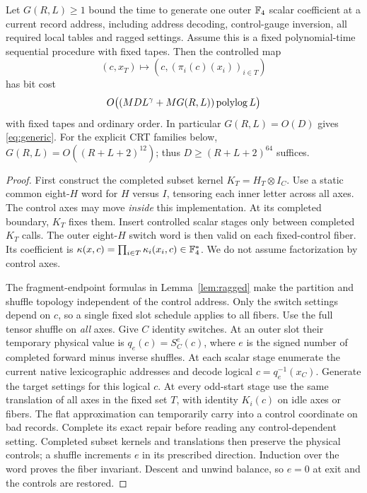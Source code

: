 \begin{lemma}
\label{lem:controlled}
Let $G(R,L)\ge1$ bound the time to generate one outer $\mathbb F_4$ scalar
coefficient at a current record address, including address decoding,
control-gauge inversion, all required local tables and ragged settings.
Assume this is a fixed polynomial-time sequential procedure with fixed
tapes. Then the controlled map
\[
 (c,x_T)\longmapsto(c,(\pi_i(c)(x_i))_{i\in T})
\]
has bit cost
\[
 O\bigl((MDL^\gamma+MG(R,L))\operatorname{polylog} L\bigr)
\]
with fixed tapes and ordinary order. In particular $G(R,L)=O(D)$
gives \eqref{eq:generic}. For the explicit CRT families below,
$G(R,L)=O((R+L+2)^{12})$; thus $D\ge(R+L+2)^{64}$ suffices.
\end{lemma}
\begin{proof}
First construct the completed subset kernel
$K_T=H_T\otimes I_C$. Use a static common eight-$H$ word for $H$ versus
$I$, tensoring each inner letter across all axes. The control axes may
move \emph{inside} this implementation. At its completed boundary,
$K_T$ fixes them. Insert controlled scalar stages only between completed
$K_T$ calls. The outer eight-$H$ switch word is then valid on each
fixed-control fiber. Its coefficient is
$\kappa(x,c)=\prod_{i\in T}\kappa_i(x_i,c)\in\mathbb F_4^*$.
We do not assume factorization by control axes.

The fragment-endpoint formulas in Lemma~\ref{lem:ragged} make the
partition and shuffle topology independent of the control address.
Only the switch settings depend on $c$, so a single fixed slot
schedule applies to all fibers.
Use the full tensor shuffle on \emph{all} axes. Give $C$ identity
switches. At an outer slot their temporary physical value is
$q_e(c)=S_C^e(c)$, where $e$ is the signed number of completed forward
minus inverse shuffles. At each scalar stage enumerate the current
native lexicographic addresses and decode logical
$c=q_e^{-1}(x_C)$. Generate the target settings for this logical $c$.
At every odd-start stage use the same translation of all axes in the
fixed set $T$, with identity $K_i(c)$ on idle axes or fibers. The flat
approximation can temporarily carry into a control coordinate on bad
records. Complete its exact repair before reading any control-dependent
setting. Completed subset kernels and translations then preserve the
physical controls; a shuffle increments $e$ in its prescribed direction.
Induction over the word proves the fiber invariant. Descent and unwind
balance, so $e=0$ at exit and the controls are restored.


\end{proof}
